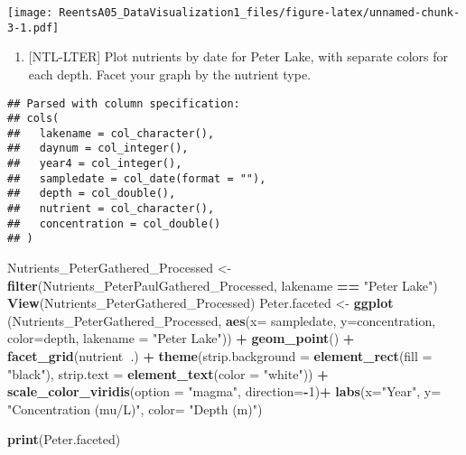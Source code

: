 \documentclass[]{article}
\newenvironment{Shaded}{\begin{snugshade}}{\end{snugshade}}
\newcommand{\KeywordTok}[1]{\textcolor[rgb]{0.13,0.29,0.53}{\textbf{#1}}}
\newcommand{\DataTypeTok}[1]{\textcolor[rgb]{0.13,0.29,0.53}{#1}}
\newcommand{\DecValTok}[1]{\textcolor[rgb]{0.00,0.00,0.81}{#1}}
\newcommand{\StringTok}[1]{\textcolor[rgb]{0.31,0.60,0.02}{#1}}
\newcommand{\CommentTok}[1]{\textcolor[rgb]{0.56,0.35,0.01}{\textit{#1}}}
\newcommand{\OperatorTok}[1]{\textcolor[rgb]{0.81,0.36,0.00}{\textbf{#1}}}
\newcommand{\NormalTok}[1]{#1}
\providecommand{\tightlist}{%
  \setlength{\itemsep}{0pt}\setlength{\parskip}{0pt}}
\begin{document}
\texttt{[image: ReentsA05\_DataVisualization1\_files/figure-latex/unnamed-chunk-3-1.pdf]}

\begin{enumerate}
\def\labelenumi{\arabic{enumi}.}
\setcounter{enumi}{4}
\tightlist
\item
  {[}NTL-LTER{]} Plot nutrients by date for Peter Lake, with separate
  colors for each depth. Facet your graph by the nutrient type.
\end{enumerate}

\begin{Shaded}
\end{Shaded}

\begin{verbatim}
## Parsed with column specification:
## cols(
##   lakename = col_character(),
##   daynum = col_integer(),
##   year4 = col_integer(),
##   sampledate = col_date(format = ""),
##   depth = col_double(),
##   nutrient = col_character(),
##   concentration = col_double()
## )
\end{verbatim}

\begin{Shaded}
\begin{Highlighting}[]
\NormalTok{Nutrients_PeterGathered_Processed <-}\StringTok{ }\KeywordTok{filter}\NormalTok{(Nutrients_PeterPaulGathered_Processed, lakename }\OperatorTok{==}\StringTok{ "Peter Lake"}\NormalTok{)}
\KeywordTok{View}\NormalTok{(Nutrients_PeterGathered_Processed)}
\NormalTok{Peter.faceted <-}\StringTok{ }\KeywordTok{ggplot}\NormalTok{ (Nutrients_PeterGathered_Processed, }\KeywordTok{aes}\NormalTok{(}\DataTypeTok{x=}\NormalTok{ sampledate, }\DataTypeTok{y=}\NormalTok{concentration, }\DataTypeTok{color=}\NormalTok{depth, }\DataTypeTok{lakename =} \StringTok{"Peter Lake"}\NormalTok{)) }\OperatorTok{+}
\StringTok{  }\KeywordTok{geom_point}\NormalTok{() }\OperatorTok{+}
\StringTok{  }\KeywordTok{facet_grid}\NormalTok{(nutrient}\OperatorTok{~}\NormalTok{.) }\OperatorTok{+}
\StringTok{  }\KeywordTok{theme}\NormalTok{(}\DataTypeTok{strip.background =} \KeywordTok{element_rect}\NormalTok{(}\DataTypeTok{fill =} \StringTok{"black"}\NormalTok{), }\DataTypeTok{strip.text =} \KeywordTok{element_text}\NormalTok{(}\DataTypeTok{color =} \StringTok{"white"}\NormalTok{)) }\OperatorTok{+}
\StringTok{  }\KeywordTok{scale_color_viridis}\NormalTok{(}\DataTypeTok{option =} \StringTok{"magma"}\NormalTok{, }\DataTypeTok{direction=}\OperatorTok{-}\DecValTok{1}\NormalTok{)}\OperatorTok{+}
\StringTok{  }\KeywordTok{labs}\NormalTok{(}\DataTypeTok{x=}\StringTok{"Year"}\NormalTok{, }\DataTypeTok{y=} \StringTok{"Concentration (mu/L)"}\NormalTok{, }\DataTypeTok{color=} \StringTok{"Depth (m)"}\NormalTok{)}
  


\KeywordTok{print}\NormalTok{(Peter.faceted)}
\end{Highlighting}
\end{Shaded}
\end{document}
